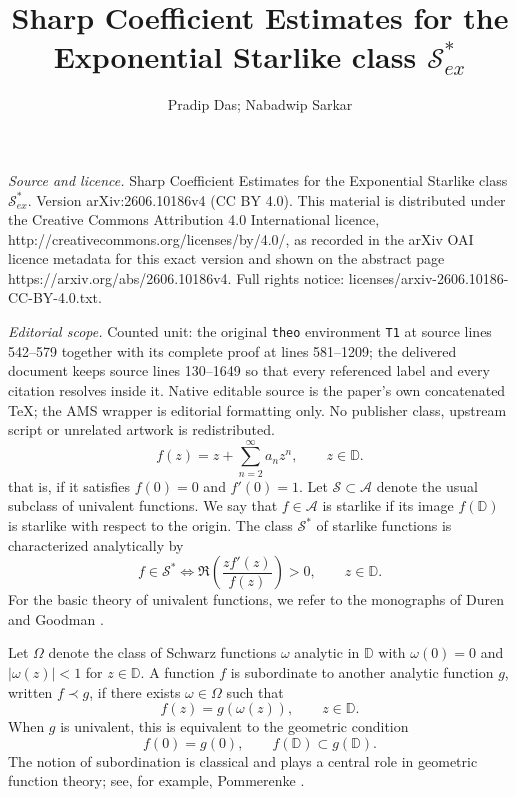 \documentclass[10pt,a4paper]{amsart}
\numberwithin{equation}{section}
\begin{document}
\title[Sharp Coefficient Estimates for the Exponential Starlike cla]{Sharp Coefficient Estimates for the Exponential Starlike class $\mathcal{S}_{ex}^{\ast}$}
\author{Pradip Das; Nabadwip Sarkar}
\date{}
\maketitle
\noindent\emph{Source and licence.} Sharp Coefficient Estimates for the Exponential Starlike class $\mathcal{S}_{ex}^{\ast}$. Version arXiv:2606.10186v4 (CC BY 4.0). This material is distributed under the Creative Commons Attribution 4.0 International licence, http://creativecommons.org/licenses/by/4.0/, as recorded in the arXiv OAI licence metadata for this exact version and shown on the abstract page https://arxiv.org/abs/2606.10186v4. Full rights notice: licenses/arxiv-2606.10186-CC-BY-4.0.txt.\par\smallskip
\noindent\textit{Editorial scope.} Counted unit: the original \texttt{theo} environment \texttt{T1} at source lines 542--579 together with its complete proof at lines 581--1209; the delivered document keeps source lines 130--1649 so that every referenced label and every citation resolves inside it. Native editable source is the paper's own concatenated TeX; the AMS wrapper is editorial formatting only. No publisher class, upstream script or unrelated artwork is redistributed.
\begin{equation}\label{eq1}
f(z)=z+\sum_{n=2}^{\infty}a_n z^n,\qquad z\in\mathbb{D}.
\end{equation}
that is, if it satisfies $f(0)=0$ and $f'(0)=1$. Let $\mathcal{S}\subset\mathcal{A}$ denote the usual subclass of univalent functions. We say that $f\in\mathcal{A}$ is starlike if its image $f(\mathbb{D})$ is starlike with respect to the origin. The class $\mathcal{S}^*$ of starlike functions is characterized analytically by
\[
f\in\mathcal{S}^*
\iff
\Re\left(\frac{zf'(z)}{f(z)}\right)>0,\qquad z\in\mathbb{D}.
\]
For the basic theory of univalent functions, we refer to the monographs of Duren \cite{PLD1} and Goodman \cite{G}.

Let $\Omega$ denote the class of Schwarz functions $\omega$ analytic in $\mathbb{D}$ with $\omega(0)=0$ and $|\omega(z)|<1$ for $z\in\mathbb{D}$. A function $f$ is subordinate to another analytic function $g$, written $f\prec g$, if there exists $\omega\in\Omega$ such that
\[
f(z)=g(\omega(z)),\qquad z\in\mathbb{D}.
\]
When $g$ is univalent, this is equivalent to the geometric condition
\[
f(0)=g(0),\qquad f(\mathbb{D})\subset g(\mathbb{D}).
\]
The notion of subordination is classical and plays a central role in geometric function theory; see, for example, Pommerenke \cite{Pommerenke1971}.
\end{document}
